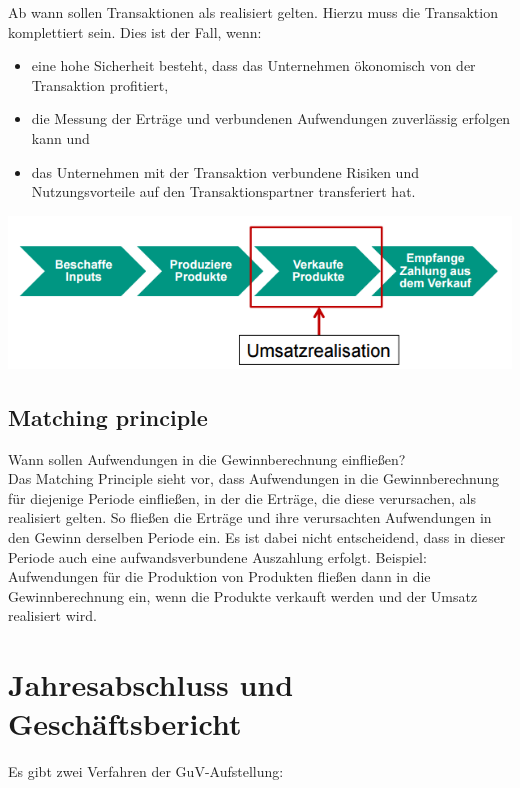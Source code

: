\documentclass{article}
\begin{document}
Ab wann sollen Transaktionen als realisiert gelten. Hierzu muss die Transaktion komplettiert sein. Dies ist der Fall, wenn:
\begin{itemize}
\item eine hohe Sicherheit besteht, dass das Unternehmen ökonomisch
von der Transaktion profitiert,\\
\item die Messung der Erträge und verbundenen Aufwendungen zuverlässig
erfolgen kann und\\
\item das Unternehmen mit der Transaktion verbundene Risiken und
Nutzungsvorteile auf den Transaktionspartner transferiert hat.
\end{itemize}
\begin{center}
\includegraphics[scale=.5]{umsatzrealisation.png}
\end{center}

\subsection{Matching principle}

Wann sollen Aufwendungen in die Gewinnberechnung einfließen? \\
Das Matching Principle sieht vor, dass Aufwendungen in die
Gewinnberechnung für diejenige Periode einfließen, in der die Erträge, die
diese verursachen, als realisiert gelten.
So fließen die Erträge und ihre verursachten Aufwendungen in den Gewinn
derselben Periode ein.
Es ist dabei nicht entscheidend, dass in dieser Periode auch eine
aufwandsverbundene Auszahlung erfolgt.
Beispiel: Aufwendungen für die Produktion von Produkten fließen dann in die
Gewinnberechnung ein, wenn die Produkte verkauft werden und der Umsatz
realisiert wird.

\section{Jahresabschluss und Geschäftsbericht}

Es gibt zwei Verfahren der GuV-Aufstellung:
\end{document}
